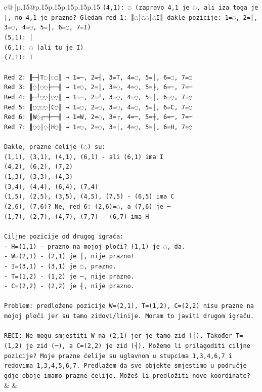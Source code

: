 \documentclass{article}
\begin{document}
{\begin{supertabular}{c@{$\;$}|p{.15\linewidth}@{}p{.15\linewidth}p{.15\linewidth}p{.15\linewidth}p{.15\linewidth}p{.15\linewidth}}
{{{\texttt{(4,1): ◌ (zapravo 4,1 je ◌, ali iza toga je |, no 4,1 je prazno? Gledam red 1: ║◌│◌◌│◌I║ dakle pozicije: 1=◌, 2=│, 3=◌, 4=◌, 5=│, 6=◌, 7=I)} \\
\texttt{(5,1): │} \\
\texttt{(6,1): ◌ (ali tu je I)} \\
\texttt{(7,1): I} \\
\\ 
\texttt{Red 2: ╟─┤T◌│◌◌║ → 1=─, 2=┤, 3=T, 4=◌, 5=│, 6=◌, 7=◌} \\
\texttt{Red 3: ║◌│◌◌├──╢ → 1=◌, 2=│, 3=◌, 4=◌, 5=├, 6=─, 7=─} \\
\texttt{Red 4: ╟─┘◌◌│◌◌║ → 1=─, 2=┘, 3=◌, 4=◌, 5=│, 6=◌, 7=◌} \\
\texttt{Red 5: ║◌◌◌◌│C◌║ → 1=◌, 2=◌, 3=◌, 4=◌, 5=│, 6=C, 7=◌} \\
\texttt{Red 6: ║W◌┌─┼──╢ → 1=W, 2=◌, 3=┌, 4=─, 5=┼, 6=─, 7=─} \\
\texttt{Red 7: ║◌◌│◌│H◌║ → 1=◌, 2=◌, 3=│, 4=◌, 5=│, 6=H, 7=◌} \\
\\ 
\texttt{Dakle, prazne ćelije (◌) su:} \\
\texttt{(1,1), (3,1), (4,1), (6,1) {-} ali (6,1) ima I} \\
\texttt{(4,2), (6,2), (7,2)} \\
\texttt{(1,3), (3,3), (4,3)} \\
\texttt{(3,4), (4,4), (6,4), (7,4)} \\
\texttt{(1,5), (2,5), (3,5), (4,5), (7,5) {-} (6,5) ima C} \\
\texttt{(2,6), (7,6)? Ne, red 6: (2,6)=◌, a (7,6) je ─} \\
\texttt{(1,7), (2,7), (4,7), (7,7) {-} (6,7) ima H} \\
\\ 
\texttt{Ciljne pozicije od drugog igrača:} \\
\texttt{{-} H=(1,1) {-} prazno na mojoj ploči? (1,1) je ◌, da.} \\
\texttt{{-} W=(2,1) {-} (2,1) je │, nije prazno!} \\
\texttt{{-} I=(3,1) {-} (3,1) je ◌, prazno.} \\
\texttt{{-} T=(1,2) {-} (1,2) je ─, nije prazno.} \\
\texttt{{-} C=(2,2) {-} (2,2) je ┤, nije prazno.} \\
\\ 
\texttt{Problem: predložene pozicije W=(2,1), T=(1,2), C=(2,2) nisu prazne na mojoj ploči jer su tamo zidovi/linije. Moram to javiti drugom igraču.} \\
\\ 
\texttt{RECI: Ne mogu smjestiti W na (2,1) jer je tamo zid (│). Također T=(1,2) je zid (─), a C=(2,2) je zid (┤). Možemo li prilagoditi ciljne pozicije? Moje prazne ćelije su uglavnom u stupcima 1,3,4,6,7 i redovima 1,3,4,5,6,7. Predlažem da sve objekte smjestimo u područje gdje oboje imamo prazne ćelije. Možeš li predložiti nove koordinate?} \\
            }
        }
    }
    & & \\ \\


\end{supertabular}}
\end{document}
